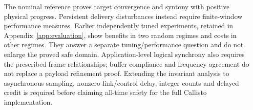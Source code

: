 The nominal reference proves target convergence and syntony with
positive physical progress. Persistent delivery disturbances instead
require finite-window performance measures. Earlier independently
tuned experiments, retained in Appendix~\ref{app:evaluation}, show
benefits in two random regimes and costs in other regimes. They
answer a separate tuning/performance question and do not enlarge
the proved safe domain. Application-level logical synchrony also
requires the prescribed frame relationships; buffer compliance and
frequency agreement do not replace a payload refinement proof.
Extending the invariant analysis to asynchronous sampling, nonzero
link/control delay, integer counts and delayed credit is required
before claiming all-time safety for the full Callisto implementation.

